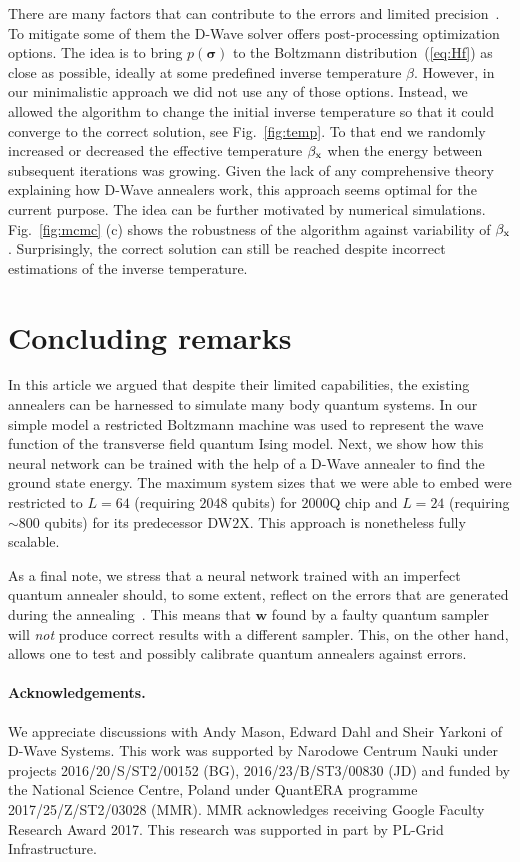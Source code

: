 \documentclass[aps,pra,showpacs,amsmath,amssymb,amsfonts,superscriptaddress,lengthcheck,longbibliography, twocolumn]{revtex4-1}
\newcommand{\bfm}{\boldsymbol}
\begin{document}
There are many factors that can contribute to the errors and limited precision~\cite{Gardas17}. To mitigate some of them 
the D-Wave solver offers post-processing optimization options. The idea is to bring $p(\bfm \sigma)$ to the Boltzmann
distribution~(\ref{eq:Hf}) as close as possible, ideally at some predefined inverse temperature $\beta$. However, in our minimalistic approach we did not use any of those options. Instead, we allowed the algorithm to change the initial inverse temperature so that it could converge to the correct solution, see Fig.~\ref{fig:temp}. To that end we randomly increased or decreased the effective temperature $\beta_{\rm x}$ when the energy between subsequent iterations was growing.  
%
Given the lack of any comprehensive theory explaining how D-Wave annealers work, this approach seems optimal for the current purpose. 
The idea can be further motivated by numerical simulations. Fig.~\ref{fig:mcmc}{\color{blue} (c)} shows the robustness of the algorithm against variability of
$\beta_{\rm x}$. Surprisingly, the correct solution can still be reached despite incorrect estimations of the inverse temperature.

\section{Concluding remarks}
%  
In this article we argued that despite their limited capabilities, the existing annealers can be harnessed to simulate many
body quantum systems. In our simple model a restricted Boltzmann machine was used to represent the wave function of
the transverse field quantum Ising model. Next, we show how this neural network can be trained with the help of a D-Wave annealer to find the ground state energy. The maximum system sizes that we were able to embed were restricted to $L=64$ (requiring $2048$ qubits) for $2000$Q chip and $L=24$ (requiring $\sim 800$ qubits) for its predecessor DW$2$X. This approach is nonetheless fully scalable.

As a final note, we stress that a neural network trained with an imperfect quantum annealer should, to some extent, 
reflect on the errors that are generated during the annealing~\cite{Gardas17}. This means that $\bfm w$ found by a 
faulty quantum sampler will \emph{not} produce correct results with a different sampler. This,
on the other hand, allows one to test and possibly calibrate quantum annealers against errors.

\begin{acknowledgements}
\paragraph*{Acknowledgements.} We appreciate discussions with Andy Mason, Edward Dahl and Sheir Yarkoni of D-Wave Systems. 
This work was supported by Narodowe Centrum Nauki under projects 2016/20/S/ST2/00152 (BG), 2016/23/B/ST3/00830 (JD) and funded by the National Science Centre, Poland under QuantERA programme 2017/25/Z/ST2/03028 (MMR). MMR acknowledges receiving Google Faculty Research Award 2017. This research was supported in part by PL-Grid Infrastructure.
\end{acknowledgements}

%
%

\end{document}
